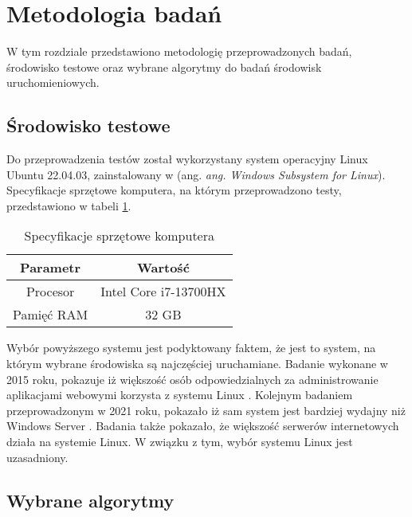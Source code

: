 \section*{Metodologia badań}

W tym rozdziale przedstawiono metodologię przeprowadzonych badań, środowisko testowe oraz wybrane algorytmy do badań środowisk uruchomieniowych.
\subsection*{Środowisko testowe}
Do przeprowadzenia testów został wykorzystany system operacyjny Linux Ubuntu 22.04.03, zainstalowany w (ang. \textit{ang. Windows Subsystem for Linux}). Specyfikacje sprzętowe komputera, na którym przeprowadzono testy, przedstawiono w tabeli \ref{tab:specyfikacje_sprzetowe}.
\begin{table}[H]
    \centering
    \begin{tabular}{|c|c|}
        \hline
        \textbf{Parametr} & \textbf{Wartość} \\
        \hline
        Procesor & Intel Core i7-13700HX \\
        \hline
        Pamięć RAM & 32 GB \\
        \hline
    \end{tabular}
    \caption{Specyfikacje sprzętowe komputera}
    \label{tab:specyfikacje_sprzetowe}
\end{table}

Wybór powyższego systemu jest podyktowany faktem, że jest to system, na którym wybrane środowiska są najczęściej uruchamiane. Badanie wykonane w 2015 roku, pokazuje iż większość osób odpowiedzialnych za administrowanie aplikacjami webowymi korzysta z systemu Linux \cite{performance_comparison_linux}. Kolejnym badaniem przeprowadzonym w 2021 roku, pokazało iż sam system jest bardziej wydajny niż Windows Server \cite{web_server_performance}. Badania także pokazało, że większość serwerów internetowych działa na systemie Linux. W związku z tym, wybór systemu Linux jest uzasadniony.

\subsection*{Wybrane algorytmy}
